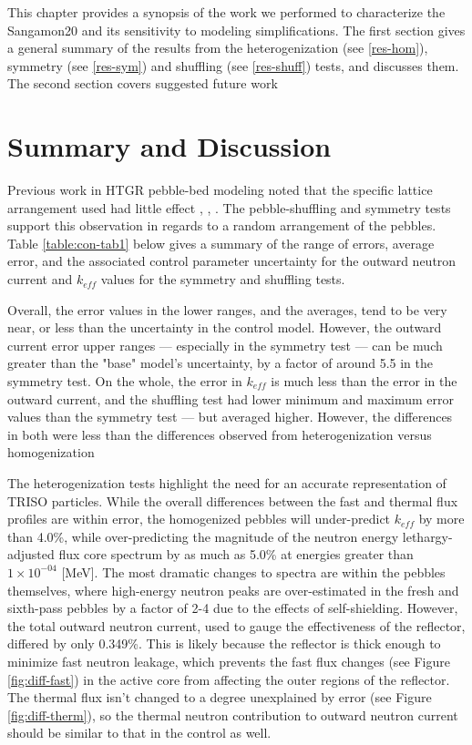 \label{conc}

This chapter provides a synopsis of the work we performed to characterize the Sangamon20 and its sensitivity to modeling simplifications.  The first section gives a general summary of the results from the heterogenization (see \autoref{res-hom}), symmetry (see \autoref{res-sym}) and shuffling (see \autoref{res-shuff}) tests, and discusses them.  The second section covers suggested future work

\section{Summary and Discussion}

Previous work in HTGR pebble-bed modeling noted that the specific lattice arrangement used had little effect \cite{turkmen_effect_2012}, \cite{karriem_mcnp_2001}, \cite{brown_stochastic_2005}.  The pebble-shuffling and symmetry tests support this observation in regards to a  random arrangement of the pebbles.  Table \ref{table:con-tab1} below gives a summary of the range of errors, average error, and the associated control parameter uncertainty for the outward neutron current and $k_{eff}$ values for the symmetry and shuffling tests.



Overall, the error values in the lower ranges, and the averages, tend to be very near, or less than  the uncertainty in the control model.  However, the outward current error upper ranges --- especially in the symmetry test --- can be much greater than the "base" model's uncertainty, by a factor of around 5.5 in the symmetry test.  On the whole, the error in $k_{eff}$ is much less than the error in the outward current, and the shuffling test had lower minimum and maximum error values than the symmetry test --- but averaged higher.  However, the differences in both were less than the differences observed from heterogenization versus homogenization

The heterogenization tests highlight the need for an accurate representation of TRISO particles.  While the overall differences between the fast and thermal flux profiles are within error, the homogenized pebbles will under-predict $k_{eff}$ by more than 4.0\%, while over-predicting the magnitude of the neutron energy lethargy-adjusted flux core spectrum by as much as 5.0\% at energies greater than $1 \times 10^{-04}$ [MeV].  The most dramatic changes to spectra are within the pebbles themselves, where high-energy neutron peaks are over-estimated in the fresh and sixth-pass pebbles by a factor of 2-4 due to the effects of self-shielding.  However, the total outward neutron current, used to gauge the effectiveness of the reflector, differed by only 0.349\%.  This is likely because the reflector is thick enough to minimize fast neutron leakage, which prevents the fast flux changes (see Figure \ref{fig:diff-fast}) in the active core from affecting the outer regions of the reflector. The thermal flux isn't changed to a degree unexplained by error (see Figure \ref{fig:diff-therm}), so the thermal neutron contribution to outward neutron current should be similar to that in the control as well.

